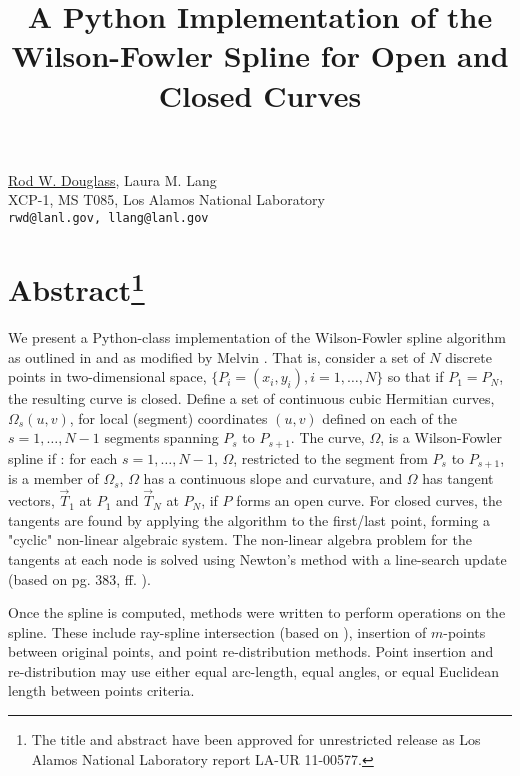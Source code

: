 \title{A Python Implementation of the Wilson-Fowler Spline for Open and Closed Curves}
\author{} \institute{}
\maketitle

\begin{center}
{\large \underline{Rod W. Douglass}, Laura M. Lang}\\
XCP-1, MS T085, Los Alamos National Laboratory\\
{\tt rwd@lanl.gov, llang@lanl.gov}
\end{center}

\section*{Abstract\footnote{The title and abstract have been approved for unrestricted release as Los Alamos 
National Laboratory report LA-UR 11-00577.}}
We present a Python-class implementation of the Wilson-Fowler spline algorithm as outlined in \cite{Wilson66} and as modified by Melvin \cite{Melvin82}.  That is, consider a set of $N$ discrete points in two-dimensional space, $\{P_i = (x_i, y_i), i = 1,\ldots,N\}$ so that if $P_1 = P_{N}$, the resulting curve is closed.  Define a set of continuous cubic Hermitian curves, $\Omega_s(u,v)$,  for local (segment) coordinates $(u,v)$ defined on each of the $s = 1,\ldots,N-1$ segments spanning $P_s$ to $P_{s+1}$. The curve, $\Omega$, is a Wilson-Fowler spline if \cite{Melvin82}: for each $s = 1, \ldots, N-1$, $\Omega$, restricted to the segment from $P_s$ to $P_{s+1}$, is a member of $\Omega_s$, $\Omega$ has a continuous slope and curvature, and $\Omega$ has tangent vectors, $\vec{T}_1$ at $P_1$ and $\vec{T}_{N}$ at $P_{N}$, if $P$ forms an open curve.  For closed curves, the tangents are found by applying the algorithm to the first/last point, forming a "cyclic" non-linear algebraic system.  The non-linear algebra problem for the tangents at each node is solved using Newton's method with a line-search update (based on pg. 383, ff. \cite{Press92}).

Once the spline is computed, methods were written to perform operations on the spline.  These include ray-spline intersection (based on \cite{Williams03}), insertion of $m$-points between original points, and point re-distribution methods.  Point insertion and re-distribution may use either equal arc-length, equal angles, or equal Euclidean length between points criteria.

